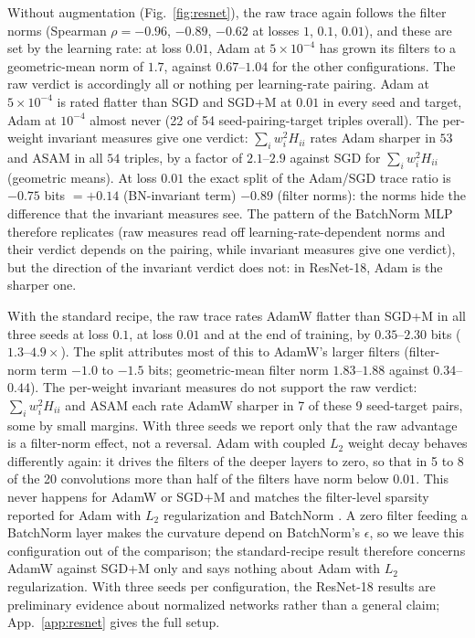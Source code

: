 \documentclass[10pt]{article}
\theoremstyle{remark}
\begin{document}
Without augmentation (Fig.~\ref{fig:resnet}), the raw trace again follows the filter norms (Spearman $\rho=-0.96$, $-0.89$, $-0.62$ at losses $1$, $0.1$, $0.01$), and these are set by the learning rate: at loss $0.01$, Adam at $5\times10^{-4}$ has grown its filters to a geometric-mean norm of $1.7$, against $0.67$--$1.04$ for the other configurations. The raw verdict is accordingly all or nothing per learning-rate pairing. Adam at $5\times10^{-4}$ is rated flatter than SGD and SGD+M at $0.01$ in every seed and target, Adam at $10^{-4}$ almost never (22 of 54 seed-pairing-target triples overall). The per-weight invariant measures give one verdict: $\sum_iw_i^2H_{ii}$ rates Adam sharper in $53$ and ASAM in all $54$ triples, by a factor of $2.1$--$2.9$ against SGD for $\sum_iw_i^2H_{ii}$ (geometric means). At loss $0.01$ the exact split of the Adam/SGD trace ratio is $-0.75$ bits $=+0.14$ (BN-invariant term) $-0.89$ (filter norms): the norms hide the difference that the invariant measures see. The pattern of the BatchNorm MLP therefore replicates (raw measures read off learning-rate-dependent norms and their verdict depends on the pairing, while invariant measures give one verdict), but the direction of the invariant verdict does not: in ResNet-18, Adam is the sharper one.

With the standard recipe, the raw trace rates AdamW flatter than SGD+M in all three seeds at loss $0.1$, at loss $0.01$ and at the end of training, by $0.35$--$2.30$ bits ($1.3$--$4.9\times$). The split attributes most of this to AdamW's larger filters (filter-norm term $-1.0$ to $-1.5$ bits; geometric-mean filter norm $1.83$--$1.88$ against $0.34$--$0.44$). The per-weight invariant measures do not support the raw verdict: $\sum_iw_i^2H_{ii}$ and ASAM each rate AdamW sharper in 7 of these 9 seed-target pairs, some by small margins. With three seeds we report only that the raw advantage is a filter-norm effect, not a reversal. Adam with coupled $L_2$ weight decay behaves differently again: it drives the filters of the deeper layers to zero, so that in 5 to 8 of the 20 convolutions more than half of the filters have norm below $0.01$. This never happens for AdamW or SGD+M and matches the filter-level sparsity reported for Adam with $L_2$ regularization and BatchNorm \citep{mehta2019filter}. A zero filter feeding a BatchNorm layer makes the curvature depend on BatchNorm's $\epsilon$, so we leave this configuration out of the comparison; the standard-recipe result therefore concerns AdamW against SGD+M only and says nothing about Adam with $L_2$ regularization. With three seeds per configuration, the ResNet-18 results are preliminary evidence about normalized networks rather than a general claim; App.~\ref{app:resnet} gives the full setup.
\end{document}

